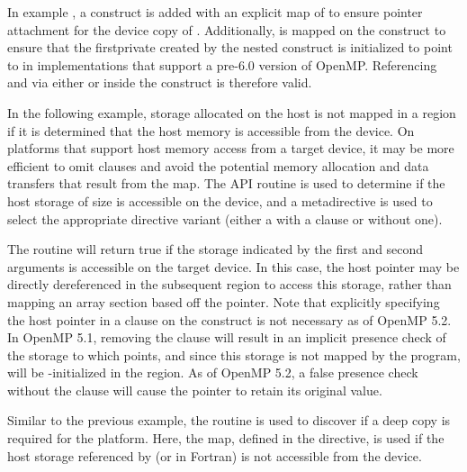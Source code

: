 
In example , a  construct is
added with an explicit map of  to ensure pointer attachment for
the device copy of . Additionally,  is mapped on the
 construct to ensure that the firstprivate 
created by the nested  construct is initialized to point to
 in implementations that support a pre-6.0 version of OpenMP.
Referencing  and  via either  or  inside
the  construct is therefore valid.



In the following example, storage allocated on the host is not mapped in a
 region if it is determined that the host memory is accessible
from the device. On platforms that support host memory access from a target
device, it may be more efficient to omit  clauses and avoid the
potential memory allocation and data transfers that result from the map. The
 API routine is used to determine if the host
storage of size  is accessible on the device, and a
metadirective is used to select the appropriate directive variant (either a
 with a  clause or without one).

The  routine will return true if the storage
indicated by the first and second arguments is accessible on the target device.
In this case, the host pointer  may be directly dereferenced in the
subsequent  region to access this storage, rather than mapping an
array section based off the pointer. Note that explicitly specifying the host
pointer in a  clause on the construct is not necessary as
of OpenMP 5.2. In OpenMP 5.1, removing the  clause will
result in an implicit presence check of the storage to which 
points, and since this storage is not mapped by the program,  will
be -initialized in the  region. As of OpenMP 5.2, a
false presence check without the  clause will cause the
pointer to retain its original value.


Similar to the previous example, the  routine
is used to discover if a deep copy is required for the platform.  Here, the
 map, defined in the  directive, is used
if the host storage referenced by  (or  in Fortran)
is not accessible from the device.

